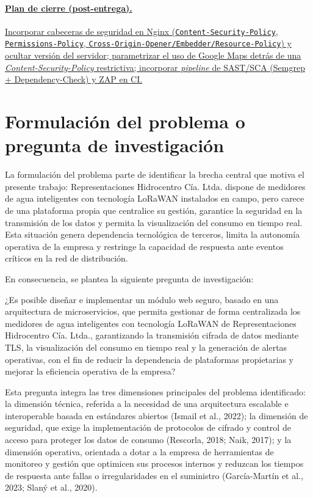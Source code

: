 \documentclass[12pt,a4paper,oneside]{report}
\providecommand{\ul}[1]{\uline{#1}}
\begin{document}
\paragraph{\ul{Plan de cierre (post-entrega).}} \ul{Incorporar cabeceras de seguridad en Nginx (\texttt{Content-Security-Policy}, \texttt{Permissions-Policy}, \texttt{Cross-Origin-Opener/Embedder/Resource-Policy}) y ocultar versión del servidor; parametrizar el uso de Google Maps detrás de una \textit{Content-Security-Policy} restrictiva; incorporar \textit{pipeline} de SAST/SCA (Semgrep + Dependency-Check) y ZAP en CI.}



\section{\texorpdfstring{Formulación del problema o pregunta de investigación }{Formulación del problema o pregunta de investigación }}\label{formulaciuxf3n-del-problema-o-pregunta-de-investigaciuxf3n}

La formulación del problema parte de identificar la brecha central que motiva el presente trabajo: Representaciones Hidrocentro Cía. Ltda. dispone de medidores de agua inteligentes con tecnología LoRaWAN instalados en campo, pero carece de una plataforma propia que centralice su gestión, garantice la seguridad en la transmisión de los datos y permita la visualización del consumo en tiempo real. Esta situación genera dependencia tecnológica de terceros, limita la autonomía operativa de la empresa y restringe la capacidad de respuesta ante eventos críticos en la red de distribución.

En consecuencia, se plantea la siguiente pregunta de investigación:

¿Es posible diseñar e implementar un módulo web seguro, basado en una arquitectura de microservicios, que permita gestionar de forma centralizada los medidores de agua inteligentes con tecnología LoRaWAN de Representaciones Hidrocentro Cía. Ltda., garantizando la transmisión cifrada de datos mediante TLS, la visualización del consumo en tiempo real y la generación de alertas operativas, con el fin de reducir la dependencia de plataformas propietarias y mejorar la eficiencia operativa de la empresa?

Esta pregunta integra las tres dimensiones principales del problema identificado: la dimensión técnica, referida a la necesidad de una arquitectura escalable e interoperable basada en estándares abiertos (Ismail et al., 2022); la dimensión de seguridad, que exige la implementación de protocolos de cifrado y control de acceso para proteger los datos de consumo (Rescorla, 2018; Naik, 2017); y la dimensión operativa, orientada a dotar a la empresa de herramientas de monitoreo y gestión que optimicen sus procesos internos y reduzcan los tiempos de respuesta ante fallas o irregularidades en el suministro (García-Martín et al., 2023; Slaný et al., 2020).
\end{document}
